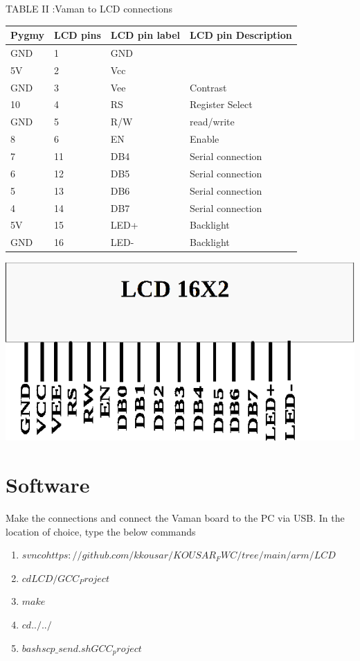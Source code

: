 \documentclass[twocolumn,13pt]{article}
\begin{document}
\begin{center}
    TABLE II :Vaman to LCD connections
\end{center}
 \begin{tabular}{ |p{1.5cm}|p{1.5cm}|p{1.5cm}|p{1.5cm}| }
 \hline
 \setlength{\tabcolsep}{3pt}
Pygmy & LCD pins & LCD pin label & LCD pin Description\\
\hline
 GND & 1& GND & \\
 \hline
 5V & 2 & Vcc &\\
 \hline
 GND & 3 & Vee & Contrast\\
 \hline
 10 & 4 & RS & Register Select\\
 \hline
 GND & 5 & R/W & read/write\\
 \hline
 8 & 6 & EN &Enable\\
 \hline
 7 & 11 & DB4 & Serial connection\\
 \hline
 6 & 12 & DB5 & Serial connection\\
 \hline
 5 & 13 & DB6 & Serial connection\\
 \hline
 4 & 14 & DB7 & Serial connection\\
 \hline
 5V & 15 & LED+ & Backlight\\
 \hline
 GND & 16 & LED- & Backlight\\
 \hline
\end{tabular}



\includegraphics[scale=0.4]{figs/lcd.png} 




\section*{\large Software}
Make the connections and connect the Vaman board to the PC via USB. In the location of choice, type the below commands
\begin{enumerate}
\item $svn co https://github.com/kkousar/KOUSAR_FWC/tree/main/arm/LCD$
\item $cd LCD/GCC_Project$
\item $make$
\item $cd ../../$

\item $bash scp\_send.sh GCC_project$
\end{enumerate}
\end{document}
